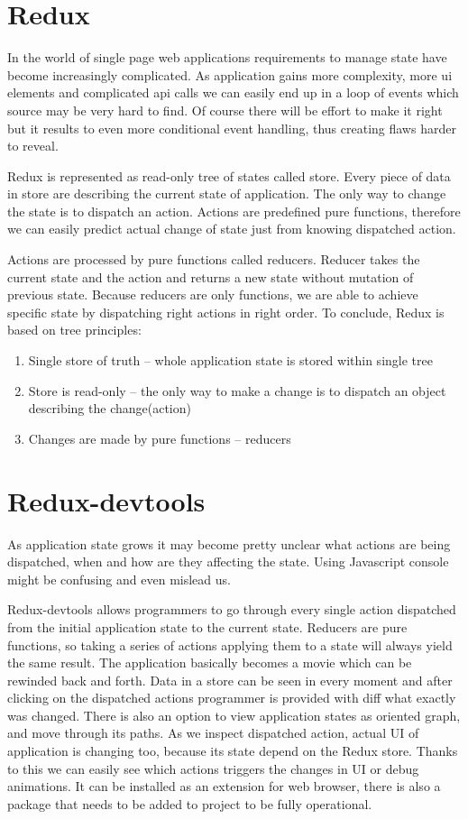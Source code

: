\section{Redux}
In the world of single page web applications requirements to manage state have become increasingly complicated. As application gains more complexity, more ui elements and complicated api calls we can easily end up in a loop of events which source may be very hard to find. Of course there will be effort to make it right but it results to even more conditional event handling, thus creating flaws harder to reveal.

Redux is represented as read-only tree of states called store. Every piece of data in store are describing the current state of application. The only way to change the state is to dispatch an action. Actions are predefined pure functions, therefore we can easily predict actual change of state just from knowing dispatched action.

Actions are processed by pure functions called reducers. Reducer takes the current state and the action and returns a new state without mutation of previous state. Because reducers are only functions, we are able to achieve specific state by dispatching right actions in right order. To conclude, Redux is based on tree principles\cite{treePrinciples}:
\begin{enumerate}
\item Single store of truth -- whole application state is stored within single tree
\item Store is read-only -- the only way to make a change is to dispatch an object describing the change(action)
\item Changes are made by pure functions -- reducers 
\end{enumerate}

\section{Redux-devtools}
As application state grows it may become pretty unclear what actions are being dispatched, when and how are they affecting the state. Using Javascript console might be confusing and even mislead us.

Redux-devtools allows programmers to go through every single action dispatched from the initial application state to the current state. Reducers are pure functions, so taking a series of actions applying them to a state will always yield the same result. The application basically becomes a movie which can be rewinded back and forth. Data in a store can be seen in every moment and after clicking on the dispatched actions programmer is provided with diff what exactly was changed. There is also an option to view application states as oriented graph, and move through its paths. As we inspect dispatched action, actual UI of application is changing too, because its state depend on the Redux store. Thanks to this we can easily see which actions triggers the changes in UI or debug animations. It can be installed as an extension for web browser, there is also a package that needs to be added to project to be fully operational.
  
